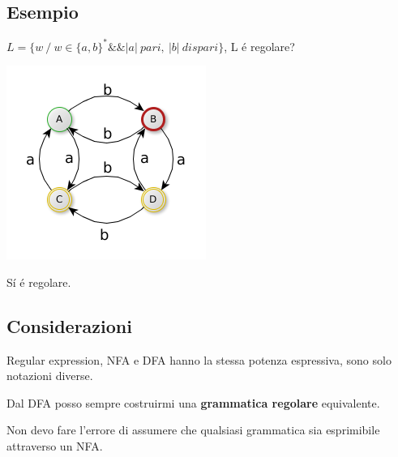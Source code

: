 \subsection{Esempio}
$L=\{ w \ / \ w \in \{ a, b \} ^* \&\& |a|\ pari,\ |b|\ dispari \}$, L \'e regolare?
\begin{center}
	\includegraphics[scale=0.6]{Chapters/Img/c02_12.png}\\
\end{center} 
S\'i \'e regolare.

\subsection{Considerazioni}
\begin{tcolorbox}\begin{center}
    Regular expression, NFA e DFA hanno la stessa potenza espressiva, sono solo notazioni diverse.\\
\end{center}\end{tcolorbox}

\begin{tcolorbox}\begin{center}
    Dal DFA posso sempre costruirmi una \textbf{grammatica regolare} equivalente.\\
\end{center}\end{tcolorbox}

\begin{tcolorbox}\begin{center}
    Non devo fare l'errore di assumere che qualsiasi grammatica sia esprimibile attraverso un NFA.\\
\end{center}\end{tcolorbox}
